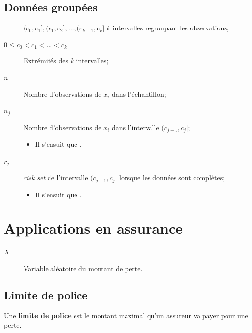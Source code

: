 \documentclass[french]{article}
\begin{document}
\begin{multicols*}{2}
\columnbreak
\subsection{Données groupées}
\begin{distributions}[Notation]
\begin{description}
	\item[]	$(c_{0}, c_{1}], (c_{1}, c_{2}], \dots, (c_{k - 1}, c_{k}]$	$k$ intervalles regroupant les observations;
	\item[$0	\leq	c_{0}	<	c_{1}	<	\hdots	<	c_{k}$]	Extrémités des $k$ intervalles;
	\item[$n$]	Nombre d'observations de $x_{i}$ dans l'échantillon;
	\item[$n_{j}$]	Nombre d'observations de $x_{i}$ dans l'intervalle $(c_{j - 1}, c_{j}]$;
		\begin{itemize}[leftmargin = *]
		\item	Il s'ensuit que .
		\end{itemize}
	\item[$r_{j}$]	\og \textit{risk set} \fg{} de l'intervalle $(c_{j - 1}, c_{j}]$ lorsque les données sont complètes;
		\begin{itemize}
		\item	Il s'ensuit que .
		\end{itemize}
\end{description}
\end{distributions}


\columnbreak
\section{Applications en assurance}
\begin{distributions}[Notation]
\begin{description}
	\item[$X$]	Variable aléatoire du montant de perte.
\end{description}
\end{distributions}


\subsection{Limite de police}
\begin{definitionNOHFILL}
Une \textbf{limite de police}  est le montant maximal qu'un assureur va payer pour une perte.


\end{definitionNOHFILL}
\end{multicols*}
\end{document}

